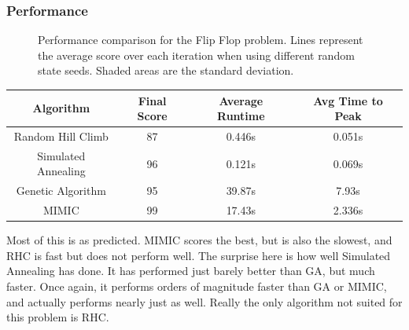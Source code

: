 \documentclass[
	letterpaper, %
]{mlreport}
\begin{document}
\subsubsection{Performance}
\begin{figure}
	\centering
	{}
	\caption{Performance comparison for the Flip Flop problem. Lines represent the average score over each iteration when using different random state seeds. Shaded areas are the standard deviation.}
	\label{fig:fig3}
\end{figure}
\begin{center}
	\begin{tabular}{|c||c|c|c|}
	 \hline
	 Algorithm & Final Score & Average Runtime & Avg Time to Peak \\
	 \hline\hline
	 Random Hill Climb & 87 & 0.446s & 0.051s  \\
	 \hline
	 Simulated Annealing & 96 & 0.121s & 0.069s  \\
	 \hline
	 Genetic Algorithm & 95 & 39.87s & 7.93s  \\
	 \hline
	 MIMIC & 99 & 17.43s & 2.336s  \\
	 \hline
	\end{tabular}
	\label{table:table2}
\end{center}
Most of this is as predicted. MIMIC scores the best, but is also the slowest, and RHC is fast but does not perform well. The surprise here is how well Simulated Annealing has done. It has performed just barely better than GA, but much faster. Once again, it performs orders of magnitude faster than GA or MIMIC, and actually performs nearly just as well. Really the only algorithm not suited for this problem is RHC.
\end{document}
